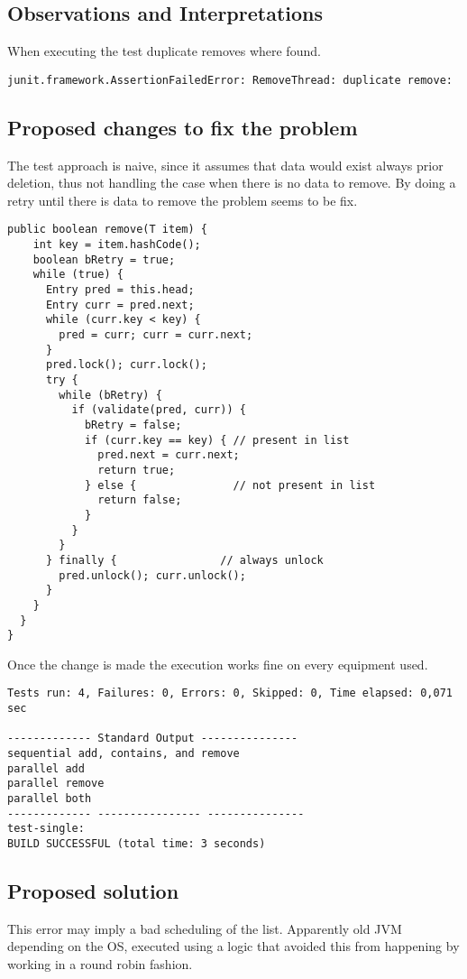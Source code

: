 
\subsection{Observations and Interpretations}

\par
When executing the test duplicate removes where found.
\begin{lstlisting}[frame=single,breaklines=true]
junit.framework.AssertionFailedError: RemoveThread: duplicate remove: 
\end{lstlisting}



\subsection{Proposed changes to fix the problem}

\par
The test approach is naive, since it assumes that data would exist always prior deletion, thus not handling the case when there is no data to remove.
By doing a retry until there is data to remove the problem seems to be fix.
\begin{lstlisting}[frame=single,breaklines=true]
  public boolean remove(T item) {
    int key = item.hashCode();
    boolean bRetry = true;
    while (true) {
      Entry pred = this.head;
      Entry curr = pred.next;
      while (curr.key < key) {
        pred = curr; curr = curr.next;
      }
      pred.lock(); curr.lock();
      try {
        while (bRetry) {
          if (validate(pred, curr)) {
            bRetry = false;
            if (curr.key == key) { // present in list
              pred.next = curr.next;
              return true;
            } else {               // not present in list
              return false;
            }
          }
        }
      } finally {                // always unlock
        pred.unlock(); curr.unlock();
      }
    }
  }
}
\end{lstlisting}
Once the change is made the execution works fine on every equipment used.
\begin{lstlisting}[frame=single,breaklines=true]
Tests run: 4, Failures: 0, Errors: 0, Skipped: 0, Time elapsed: 0,071 sec

------------- Standard Output ---------------
sequential add, contains, and remove
parallel add
parallel remove
parallel both
------------- ---------------- ---------------
test-single:
BUILD SUCCESSFUL (total time: 3 seconds)
\end{lstlisting}



\subsection{Proposed solution}
\par
This error may imply a bad scheduling of the list. Apparently old JVM depending on the OS, executed using a logic that avoided this from happening by working in a round robin fashion.

